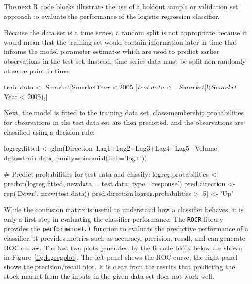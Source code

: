 The next R code blocks illustrate the use of a holdout sample or validation set approach to evaluate the performance of the logistic regression classifier. 

Because the data set is a time series, a random split is not appropriate because it would mean that the training set would contain information later in time that informs the model parameter estimates which are used to predict earlier observations in the test set. Instead, time series data must be split non-randomly at some point in time:

\begin{samepage}
\begin{Rcode}
train.data <- Smarket[Smarket$Year < 2005,]
test.data <- Smarket[!(Smarket$Year < 2005),]
\end{Rcode}
\end{samepage}

\noindent Next, the model is fitted to the training data set, class-membership probabilities for observations in the test data set are then predicted, and the observations are classified using a decision rule:
\begin{samepage}
\begin{Rcode}
logreg.fitted <- 
   glm(Direction~Lag1+Lag2+Lag3+Lag4+Lag5+Volume, data=train.data,  
            family=binomial(link='logit'))

# Predict probabilities for test data and classify:
logreg.probabilities <- predict(logreg.fitted, newdata = test.data,
                                  type='response')
pred.direction <- rep('Down', nrow(test.data))
pred.direction[logreg.probabilities > .5] <- 'Up'
\end{Rcode}
\end{samepage}

While the confusion matrix is useful to understand how a classifier behaves, it is only a first step in evaluating the classifier performance. The \texttt{ROCR} library provides the \texttt{performance(.)} function to evaluate the predictive performance of a classifier. It provides metrics such as accuracy, precision, recall, and can generate ROC curves. The last two plots generated by the R code block below are shown in Figure~\ref{fig:logregplot}. The left panel shows the ROC curve, the right panel shows the precision/recall plot. It is clear from the results that predicting the stock market from the inputs in the given data set does not work well.

